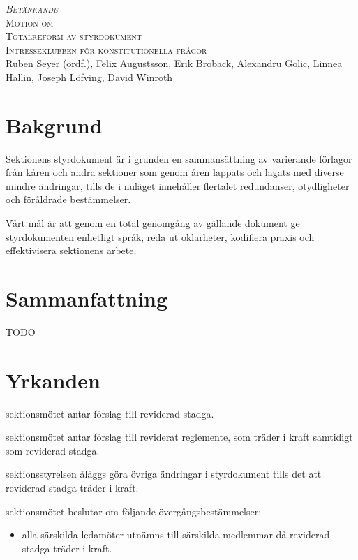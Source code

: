\documentclass{article}
\newcommand{\motionsnamn}{Totalreform av styrdokument}
\newcommand{\motionar}{Intresseklubben för konstitutionella frågor}
\begin{document}
\begin{center}
\textsc{\huge\itshape Betänkande}\\[0.5cm]
\textsc{\Huge Motion om}\\[0.5cm]
\textsc{\huge \motionsnamn}\\[0.5cm]
\textsc{\large \motionar\\}
Ruben Seyer (ordf.), Felix Augustsson, Erik Broback, Alexandru Golic, Linnea
Hallin, Joseph Löfving, David Winroth
\end{center}

\section*{Bakgrund}
Sektionens styrdokument är i grunden en sammansättning av varierande förlagor
från kåren och andra sektioner som genom åren lappats och lagats med diverse
mindre ändringar, tills de i nuläget innehåller flertalet redundanser,
otydligheter och föråldrade bestämmelser.

Vårt mål är att genom en total genomgång av gällande dokument ge styrdokumenten
enhetligt språk, reda ut oklarheter, kodifiera praxis och effektivisera
sektionens arbete.

\section*{Sammanfattning}
TODO

\section*{Yrkanden}
\begin{beslut}
	\item sektionsmötet antar förslag till reviderad stadga.
	\item sektionsmötet antar förslag till reviderat reglemente, som träder i
    kraft samtidigt som reviderad stadga.
	\item sektionsstyrelsen åläggs göra övriga ändringar i styrdokument tills det
    att reviderad stadga träder i kraft.
	\item sektionsmötet beslutar om följande övergångsbestämmelser:
	\begin{itemize}
  \item alla särskilda ledamöter utnämns till särskilda medlemmar då
    reviderad stadga träder i kraft.
	\end{itemize}
\end{beslut}
\end{document}
